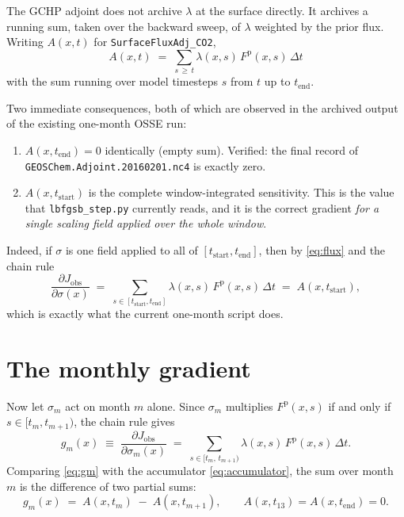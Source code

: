 \documentclass[12pt]{article}
\newcommand{\Fprior}{F^{\mathrm{p}}}
\newcommand{\tend}{t_{\mathrm{end}}}
\newcommand{\tstart}{t_{\mathrm{start}}}
\newcommand{\Adj}{A}
\begin{document}
The GCHP adjoint does not archive $\lambda$ at the surface directly. It archives a
running sum, taken over the backward sweep, of $\lambda$ weighted by the prior flux.
Writing $\Adj(x,t)$ for \texttt{SurfaceFluxAdj\_CO2},
%
\begin{equation}
  \boxed{\;\Adj(x,t) \;=\; \sum_{s \,\ge\, t} \lambda(x,s)\,\Fprior(x,s)\,\Delta t \;}
  \label{eq:accumulator}
\end{equation}
%
with the sum running over model timesteps $s$ from $t$ up to $\tend$.

Two immediate consequences, both of which are observed in the archived output of the
existing one-month OSSE run:
%
\begin{enumerate}
  \item $\Adj(x,\tend) = 0$ identically (empty sum). Verified: the final record of
        \texttt{GEOSChem.Adjoint.20160201.nc4} is exactly zero.
  \item $\Adj(x,\tstart)$ is the complete window-integrated sensitivity. This is the
        value that \texttt{lbfgsb\_step.py} currently reads, and it is the correct
        gradient \emph{for a single scaling field applied over the whole window}.
\end{enumerate}

Indeed, if $\sigma$ is one field applied to all of $[\tstart,\tend]$, then by
\eqref{eq:flux} and the chain rule
%
\begin{equation}
  \frac{\partial J_{\mathrm{obs}}}{\partial \sigma(x)}
  \;=\; \sum_{s \in [\tstart,\tend]} \lambda(x,s)\,\Fprior(x,s)\,\Delta t
  \;=\; \Adj(x,\tstart),
\end{equation}
%
which is exactly what the current one-month script does.

\section{The monthly gradient}

Now let $\sigma_m$ act on month $m$ alone. Since $\sigma_m$ multiplies $\Fprior(x,s)$
if and only if $s \in [t_m, t_{m+1})$, the chain rule gives
%
\begin{equation}
  g_m(x) \;\equiv\; \frac{\partial J_{\mathrm{obs}}}{\partial \sigma_m(x)}
  \;=\; \sum_{s \in [t_m,\,t_{m+1})} \lambda(x,s)\,\Fprior(x,s)\,\Delta t .
  \label{eq:gm}
\end{equation}
%
Comparing \eqref{eq:gm} with the accumulator \eqref{eq:accumulator}, the sum over
month $m$ is the difference of two partial sums:
%
\begin{equation}
  \boxed{\;g_m(x) \;=\; \Adj(x,t_m) \;-\; \Adj(x,t_{m+1}),
  \qquad \Adj(x,t_{13}) = \Adj(x,\tend) = 0. \;}
  \label{eq:diff}
\end{equation}
\end{document}
